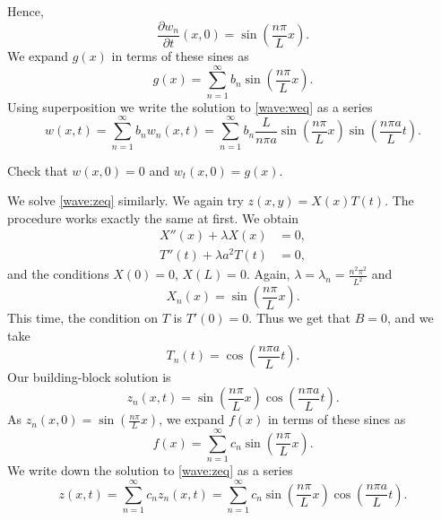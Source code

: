 Hence,
\begin{equation*}
\frac{\partial w_n}{\partial t}(x,0) =
\sin \left( \frac{n \pi}{L} x \right) .
\end{equation*}
We expand $g(x)$ in terms of these sines as
\begin{equation*}
g(x) =
\sum_{n=1}^\infty b_n \sin \left( \frac{n \pi}{L} x \right) .
\end{equation*}
Using superposition
we write the solution to \eqref{wave:weq} as a series
\begin{equation*}
w(x,t) =
\sum_{n=1}^\infty
b_n
w_n(x,t)
=
\sum_{n=1}^\infty
b_n
\frac{L}{n \pi a}
\sin \left( \frac{n \pi}{L} x \right)
\sin \left( \frac{n \pi a}{L} t \right) .
\end{equation*}

\begin{exercise}
Check that $w(x,0) = 0$ and
$w_t(x,0) = g(x)$.
\end{exercise}

We solve \eqref{wave:zeq} similarly.  We again try
$z(x,y) = X(x)T(t)$.  The procedure works exactly the same at first.
We obtain
\begin{align*}
X''(x) + \lambda X(x) &= 0 , \\
T''(t) + \lambda a^2 T(t) &= 0 ,
\end{align*}
and the conditions $X(0) = 0$, $X(L) = 0$.  Again,
$\lambda = \lambda_n = \frac{n^2 \pi^2}{L^2}$ and
\begin{equation*}
X_n(x) = \sin \left( \frac{n \pi}{L} x \right) .
\end{equation*}
This time,
the condition on $T$ is $T'(0) = 0$.  Thus 
we get that $B = 0$, and we take
\begin{equation*}
T_n(t) = \cos \left( \frac{n \pi a}{L} t \right).
\end{equation*}
Our building-block solution is
\begin{equation*}
z_n(x,t) = 
\sin \left( \frac{n \pi}{L} x \right)
\cos \left( \frac{n \pi a}{L} t \right) .
\end{equation*}
As $z_n(x,0) = \sin \left( \frac{n \pi}{L} x \right)$,
we expand $f(x)$ in terms of these sines as
\begin{equation*}
f(x) =
\sum_{n=1}^\infty c_n \sin \left( \frac{n \pi}{L} x \right) .
\end{equation*}
We
write down the solution to \eqref{wave:zeq} as a series
\begin{equation*}
z(x,t) =
\sum_{n=1}^\infty
c_n
z_n(x,t)
=
\sum_{n=1}^\infty
c_n
\sin \left( \frac{n \pi}{L} x \right)
\cos \left( \frac{n \pi a}{L} t \right) .
\end{equation*}

